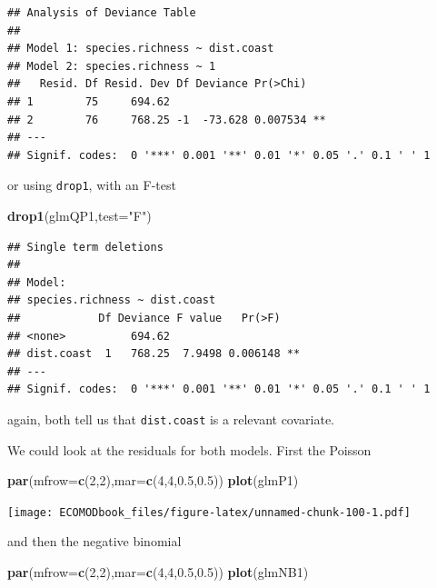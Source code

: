 \documentclass[
]{book}
\newenvironment{Shaded}{\begin{snugshade}}{\end{snugshade}}
\newcommand{\AttributeTok}[1]{\textcolor[rgb]{0.13,0.29,0.53}{#1}}
\newcommand{\DecValTok}[1]{\textcolor[rgb]{0.00,0.00,0.81}{#1}}
\newcommand{\FloatTok}[1]{\textcolor[rgb]{0.00,0.00,0.81}{#1}}
\newcommand{\FunctionTok}[1]{\textcolor[rgb]{0.13,0.29,0.53}{\textbf{#1}}}
\newcommand{\NormalTok}[1]{#1}
\newcommand{\StringTok}[1]{\textcolor[rgb]{0.31,0.60,0.02}{#1}}
\begin{document}
\begin{verbatim}
## Analysis of Deviance Table
## 
## Model 1: species.richness ~ dist.coast
## Model 2: species.richness ~ 1
##   Resid. Df Resid. Dev Df Deviance Pr(>Chi)   
## 1        75     694.62                        
## 2        76     768.25 -1  -73.628 0.007534 **
## ---
## Signif. codes:  0 '***' 0.001 '**' 0.01 '*' 0.05 '.' 0.1 ' ' 1
\end{verbatim}

or using \texttt{drop1}, with an F-test

\begin{Shaded}
\begin{Highlighting}[]
\FunctionTok{drop1}\NormalTok{(glmQP1,}\AttributeTok{test=}\StringTok{"F"}\NormalTok{)}
\end{Highlighting}
\end{Shaded}

\begin{verbatim}
## Single term deletions
## 
## Model:
## species.richness ~ dist.coast
##            Df Deviance F value   Pr(>F)   
## <none>          694.62                    
## dist.coast  1   768.25  7.9498 0.006148 **
## ---
## Signif. codes:  0 '***' 0.001 '**' 0.01 '*' 0.05 '.' 0.1 ' ' 1
\end{verbatim}

again, both tell us that \texttt{dist.coast} is a relevant covariate.

We could look at the residuals for both models. First the Poisson

\begin{Shaded}
\begin{Highlighting}[]
\FunctionTok{par}\NormalTok{(}\AttributeTok{mfrow=}\FunctionTok{c}\NormalTok{(}\DecValTok{2}\NormalTok{,}\DecValTok{2}\NormalTok{),}\AttributeTok{mar=}\FunctionTok{c}\NormalTok{(}\DecValTok{4}\NormalTok{,}\DecValTok{4}\NormalTok{,}\FloatTok{0.5}\NormalTok{,}\FloatTok{0.5}\NormalTok{))}
\FunctionTok{plot}\NormalTok{(glmP1)}
\end{Highlighting}
\end{Shaded}

\texttt{[image: ECOMODbook\_files/figure-latex/unnamed-chunk-100-1.pdf]}

and then the negative binomial

\begin{Shaded}
\begin{Highlighting}[]
\FunctionTok{par}\NormalTok{(}\AttributeTok{mfrow=}\FunctionTok{c}\NormalTok{(}\DecValTok{2}\NormalTok{,}\DecValTok{2}\NormalTok{),}\AttributeTok{mar=}\FunctionTok{c}\NormalTok{(}\DecValTok{4}\NormalTok{,}\DecValTok{4}\NormalTok{,}\FloatTok{0.5}\NormalTok{,}\FloatTok{0.5}\NormalTok{))}
\FunctionTok{plot}\NormalTok{(glmNB1)}
\end{Highlighting}
\end{Shaded}
\end{document}
